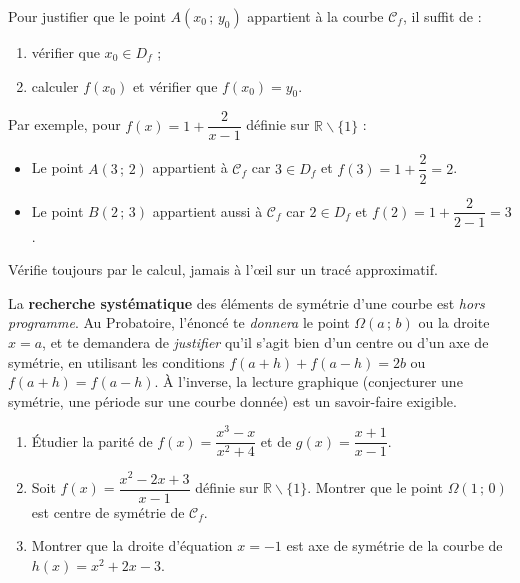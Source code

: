 \documentclass[11pt]{article}
\def\setminus{\mathbin{\backslash}}\let\smallsetminus\setminus
\begin{document}
\begin{methode}
Pour justifier que le point $A(x_0\,;\,y_0)$ appartient à la courbe $\mathcal{C}_f$, il suffit de :
\begin{enumerate}
\item vérifier que $x_0 \in D_f$ ;
\item calculer $f(x_0)$ et vérifier que $f(x_0) = y_0$.
\end{enumerate}
Par exemple, pour $f(x) = 1 + \dfrac{2}{x-1}$ définie sur $\mathbb{R}\setminus\{1\}$ :
\begin{itemize}
\item Le point $A(3\,;\,2)$ appartient à $\mathcal{C}_f$ car $3 \in D_f$ et $f(3) = 1 + \dfrac{2}{2} = 2$.
\item Le point $B(2\,;\,3)$ appartient aussi à $\mathcal{C}_f$ car $2 \in D_f$ et $f(2) = 1 + \dfrac{2}{2-1} = 3$.
\end{itemize}
Vérifie toujours par le calcul, jamais à l'œil sur un tracé approximatif.
\end{methode}

\begin{attention}
La \textbf{recherche systématique} des éléments de symétrie d'une courbe est \emph{hors programme}. Au Probatoire, l'énoncé te \emph{donnera} le point $\Omega(a\,;\,b)$ ou la droite $x = a$, et te demandera de \emph{justifier} qu'il s'agit bien d'un centre ou d'un axe de symétrie, en utilisant les conditions $f(a+h) + f(a-h) = 2b$ ou $f(a+h) = f(a-h)$. À l'inverse, la lecture graphique (conjecturer une symétrie, une période sur une courbe donnée) est un savoir-faire exigible.
\end{attention}

\begin{exercice}
\begin{enumerate}
\item Étudier la parité de $f(x) = \dfrac{x^3 - x}{x^2 + 4}$ et de $g(x) = \dfrac{x + 1}{x - 1}$.
\item Soit $f(x) = \dfrac{x^2 - 2x + 3}{x - 1}$ définie sur $\mathbb{R} \setminus \{1\}$. Montrer que le point $\Omega(1\,;\,0)$ est centre de symétrie de $\mathcal{C}_f$.
\item Montrer que la droite d'équation $x = -1$ est axe de symétrie de la courbe de $h(x) = x^2 + 2x - 3$.
\end{enumerate}
\end{exercice}
\end{document}
